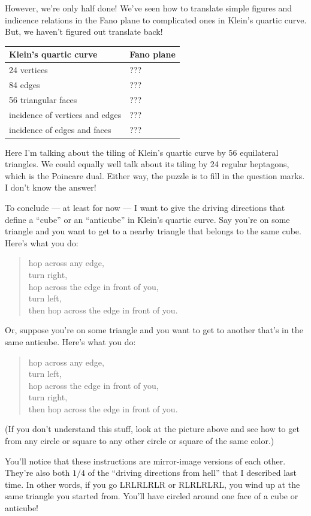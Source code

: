 \documentclass{article}
\begin{document}
However, we're only half done! We've seen how to translate simple
figures and indicence relations in the Fano plane to complicated ones in
Klein's quartic curve. But, we haven't figured out translate back!

\begin{longtable}[]{@{}ll@{}}
\toprule
Klein's quartic curve & Fano plane\tabularnewline
\midrule
\endhead
24 vertices & ???\tabularnewline
84 edges & ???\tabularnewline
56 triangular faces & ???\tabularnewline
incidence of vertices and edges & ???\tabularnewline
incidence of edges and faces & ???\tabularnewline
\bottomrule
\end{longtable}

Here I'm talking about the tiling of Klein's quartic curve by 56
equilateral triangles. We could equally well talk about its tiling by 24
regular heptagons, which is the Poincare dual. Either way, the puzzle is
to fill in the question marks. I don't know the answer!

To conclude --- at least for now --- I want to give the driving
directions that define a ``cube'' or an ``anticube'' in Klein's quartic
curve. Say you're on some triangle and you want to get to a nearby
triangle that belongs to the same cube. Here's what you do:

\begin{quote}
hop across any edge,\\
turn right,\\
hop across the edge in front of you,\\
turn left,\\
then hop across the edge in front of you.
\end{quote}

Or, suppose you're on some triangle and you want to get to another
that's in the same anticube. Here's what you do:

\begin{quote}
hop across any edge,\\
turn left,\\
hop across the edge in front of you,\\
turn right,\\
then hop across the edge in front of you.
\end{quote}

(If you don't understand this stuff, look at the picture above and see
how to get from any circle or square to any other circle or square of
the same color.)

You'll notice that these instructions are mirror-image versions of each
other. They're also both \(1/4\) of the ``driving directions from hell''
that I described last time. In other words, if you go LRLRLRLR or
RLRLRLRL, you wind up at the same triangle you started from. You'll have
circled around one face of a cube or anticube!
\end{document}
